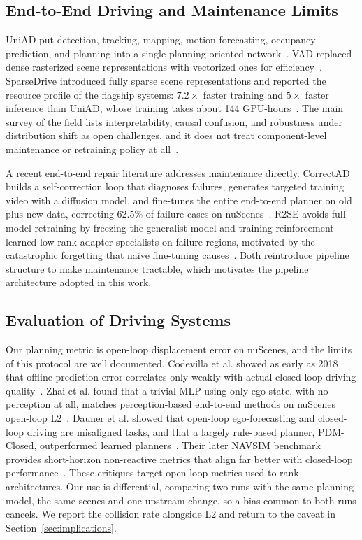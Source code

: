 \documentclass[conference]{IEEEtran}
\begin{document}
\subsection{End-to-End Driving and Maintenance Limits}
UniAD put detection, tracking, mapping, motion forecasting, occupancy
prediction, and planning into a single planning-oriented
network~\cite{hu2023uniad}. VAD replaced dense rasterized scene
representations with vectorized ones for efficiency~\cite{jiang2023vad}.
SparseDrive introduced fully sparse scene representations and reported the
resource profile of the flagship systems: $7.2\times$ faster training and
$5\times$ faster inference than UniAD, whose training takes about 144
GPU-hours~\cite{sun2024sparsedrive}. The main survey of the field lists
interpretability, causal confusion, and robustness under distribution shift
as open challenges, and it does not treat component-level maintenance or
retraining policy at all~\cite{chen2024e2esurvey}.

A recent end-to-end repair literature addresses maintenance directly. CorrectAD
builds a self-correction loop that diagnoses failures, generates targeted
training video with a diffusion model, and fine-tunes the entire end-to-end planner
on old plus new data, correcting 62.5\% of failure cases on
nuScenes~\cite{ma2025correctad}. R2SE avoids full-model retraining by freezing
the generalist model and training reinforcement-learned low-rank adapter
specialists on failure regions, motivated by the catastrophic forgetting that
naive fine-tuning causes~\cite{liu2025r2se}. Both reintroduce pipeline structure
to make maintenance tractable, which motivates the pipeline architecture adopted
in this work.

\subsection{Evaluation of Driving Systems}
Our planning metric is open-loop displacement error on nuScenes, and the
limits of this protocol are well documented. Codevilla et al. showed as early
as 2018 that offline prediction error correlates only weakly with actual
closed-loop driving quality~\cite{codevilla2018offline}. Zhai et al. found
that a trivial MLP using only ego state, with no perception at all, matches
perception-based end-to-end methods on nuScenes open-loop
L2~\cite{zhai2023rethinking}. Dauner et al. showed that open-loop
ego-forecasting and closed-loop driving are misaligned tasks, and that a
largely rule-based planner, PDM-Closed, outperformed learned
planners~\cite{dauner2023parting}. Their later NAVSIM benchmark provides
short-horizon non-reactive metrics that align far better with closed-loop
performance~\cite{dauner2024navsim}. These critiques target open-loop metrics
used to rank architectures. Our use is differential, comparing two runs with the
same planning model, the same scenes and one upstream change, so a bias common to both
runs cancels. We report the collision rate alongside L2 and return to the caveat
in Section~\ref{sec:implications}.
\end{document}
